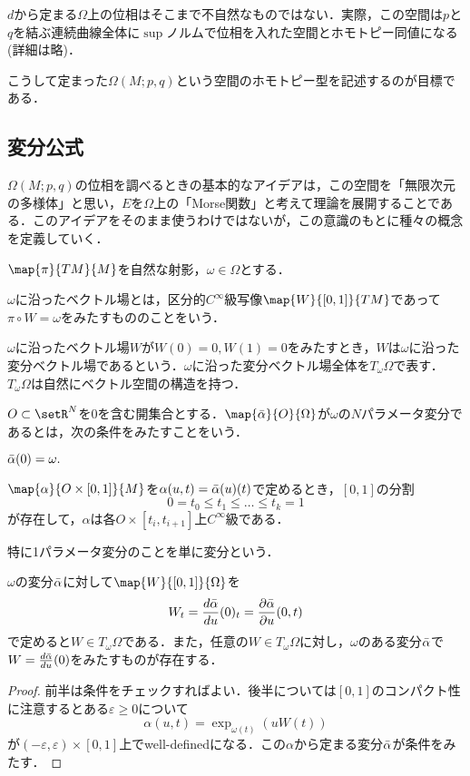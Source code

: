 \documentclass[uplatex]{jsarticle}
\begin{document}
\begin{remark}
$d$から定まる$\Omega$上の位相はそこまで不自然なものではない．実際，この空間は$p$と$q$を結ぶ連続曲線全体に$\sup$ノルムで位相を入れた空間とホモトピー同値になる(詳細は略)．
\end{remark}

こうして定まった$\Omega(M;p,q)$という空間のホモトピー型を記述するのが目標である．

\subsection{変分公式}

$\Omega(M;p,q)$の位相を調べるときの基本的なアイデアは，この空間を「無限次元の多様体」と思い，$E$を$\Omega$上の「Morse関数」と考えて理論を展開することである．このアイデアをそのまま使うわけではないが，この意識のもとに種々の概念を定義していく．

\begin{definition}
$\map{\pi}{TM}{M}$を自然な射影，$\omega \in \Omega$とする．
\begin{enumarabicp}
\item $\omega$に沿ったベクトル場とは，区分的$C^{\infty}$級写像$\map{W}{[0,1]}{TM}$であって$\pi \circ W = \omega$をみたすもののことをいう．
\item $\omega$に沿ったベクトル場$W$が$W(0)=0,W(1)=0$をみたすとき，$W$は$\omega$に沿った変分ベクトル場であるという．$\omega$に沿った変分ベクトル場全体を$T_\omega \Omega$で表す．$T_\omega \Omega$は自然にベクトル空間の構造を持つ．
\item $O \subset \setR^N$を$0$を含む開集合とする．$\map{\Bar{\alpha}}{O}{\Omega}$が$\omega$の$N$パラメータ変分であるとは，次の条件をみたすことをいう．
\begin{enumromanp}
\item $\Bar{\alpha}(0) = \omega.$
\item $\map{\alpha}{O\times [0,1]}{M}$を$\alpha(u,t) = \Bar{\alpha}(u)(t)$で定めるとき，$[0,1]$の分割
\[ 0 = t_0 \le t_1 \le \dots \le t_k =1 \]
が存在して，$\alpha$は各$O\times [t_i,t_{i+1}]$上$C^{\infty}$級である．
\end{enumromanp}
特に1パラメータ変分のことを単に変分という．
\end{enumarabicp}
\end{definition}

\begin{proposition}
$\omega$の変分$\Bar{\alpha}$に対して$\map{W}{[0,1]}{\Omega}$を
\[ W_t = \frac{d\Bar{\alpha}}{du}(0)_t = \frac{\partial \Bar{\alpha}}{\partial u}(0,t) \]
で定めると$W \in T_\omega \Omega$である．また，任意の$W\in T_\omega \Omega$に対し，$\omega$のある変分$\Bar{\alpha}$で$W = \frac{d\Bar{\alpha}}{du}(0)$をみたすものが存在する．
\end{proposition}
\begin{proof}
前半は条件をチェックすればよい．後半については$[0,1]$のコンパクト性に注意するとある$\varepsilon \geq 0$について
\[ \alpha(u,t) = \exp_{\omega(t)}(uW(t)) \]
が$(-\varepsilon,\varepsilon)\times [0,1]$上でwell-definedになる．この$\alpha$から定まる変分$\Bar{\alpha}$が条件をみたす．
\end{proof}
\end{document}
